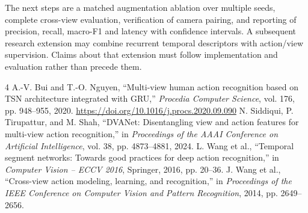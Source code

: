 \documentclass[runningheads]{llncs}
\begin{document}
The next steps are a matched augmentation ablation over multiple seeds, complete cross-view evaluation, verification of camera pairing, and reporting of precision, recall, macro-F1 and latency with confidence intervals. A subsequent research extension may combine recurrent temporal descriptors with action/view supervision. Claims about that extension must follow implementation and evaluation rather than precede them.

\begin{thebibliography}{4}
 A.-V. Bui and T.-O. Nguyen, ``Multi-view human action recognition based on TSN architecture integrated with GRU,'' \textit{Procedia Computer Science}, vol. 176, pp. 948--955, 2020. \url{https://doi.org/10.1016/j.procs.2020.09.090}
 N. Siddiqui, P. Tirupattur, and M. Shah, ``DVANet: Disentangling view and action features for multi-view action recognition,'' in \textit{Proceedings of the AAAI Conference on Artificial Intelligence}, vol. 38, pp. 4873--4881, 2024.
 L. Wang et al., ``Temporal segment networks: Towards good practices for deep action recognition,'' in \textit{Computer Vision -- ECCV 2016}, Springer, 2016, pp. 20--36.
 J. Wang et al., ``Cross-view action modeling, learning, and recognition,'' in \textit{Proceedings of the IEEE Conference on Computer Vision and Pattern Recognition}, 2014, pp. 2649--2656.
\end{thebibliography}
\end{document}
